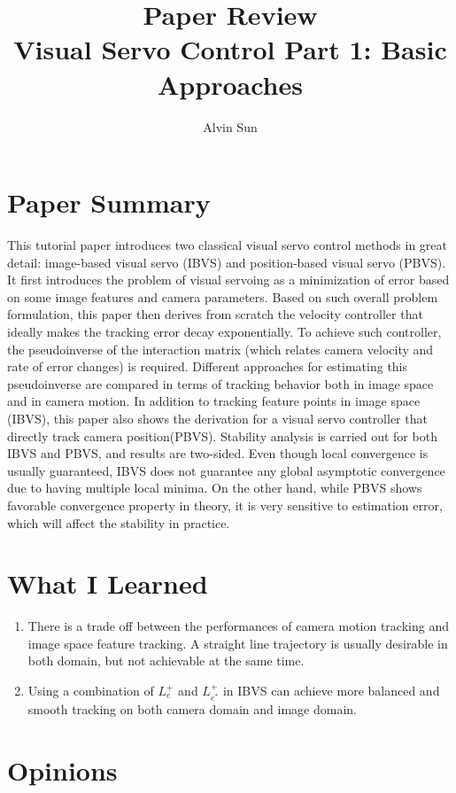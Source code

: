 \documentclass[10pt, twocolumn]{article}
\title{\vspace{-3.0em}Paper Review\\Visual Servo Control Part 1: Basic Approaches}
\author{Alvin Sun}
\begin{document}
\maketitle

\section{Paper Summary}
This tutorial paper introduces two classical visual servo control methods
in great detail: image-based visual servo (IBVS) and position-based visual servo (PBVS).
It first introduces the problem of visual servoing as a minimization of error
based on some image features and camera parameters. Based on such overall
problem formulation, this paper then derives from scratch the velocity controller
that ideally makes the tracking error decay exponentially. To achieve such
controller, the pseudoinverse of the interaction matrix (which relates camera velocity
and rate of error changes) is required. Different approaches for estimating
this pseudoinverse are compared in terms of tracking behavior both in image
space and in camera motion. In addition to tracking feature points in image space
(IBVS), this paper also shows the derivation for a visual servo controller
that directly track camera position(PBVS). Stability analysis is carried out
for both IBVS and PBVS, and results are two-sided. Even though local convergence
is usually guaranteed, IBVS does not guarantee any global asymptotic convergence
due to having multiple local minima. On the other hand, while PBVS shows favorable
convergence property in theory, it is very sensitive to estimation error,
which will affect the stability in practice.

\section{What I Learned}
\begin{enumerate}
  \item There is a trade off between the performances of camera motion
    tracking and image space feature tracking. A straight line trajectory
    is usually desirable in both domain, but not achievable at the same time.

  \item Using a combination of $L_e^+$ and $L_{e^*}^+$ in IBVS can achieve
    more balanced and smooth tracking on both camera domain and image domain.
\end{enumerate}

\section{Opinions}
\end{document}
